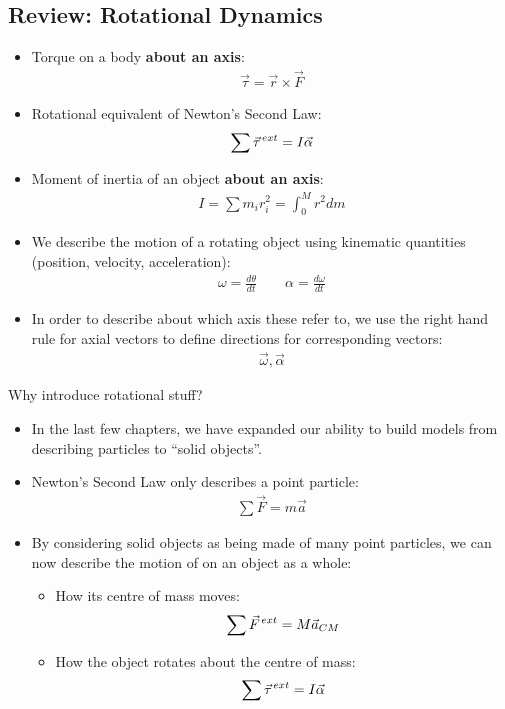 \documentclass[aspectratio=169,
hyperref={colorlinks,urlcolor=blue}
]{beamer}
\begin{document}
\subsection{Review: Rotational Dynamics}
\label{subsec:rotationaldynamicsreview}
{
\begin{itemize}
\item Torque on a body \textbf{about an axis}:
\begin{align*}
\vec \tau = \vec r \times \vec F
\end{align*}
\item Rotational equivalent of Newton's Second Law:
\begin{align*}
\sum \pvec \tau^{ext}=I\vec \alpha
\end{align*}
\item Moment of inertia of an object \textbf{about an axis}:
\begin{align*}
I = \sum m_ir_i^2=\int_0^Mr^2dm
\end{align*}
\end{itemize}
}
{
\begin{itemize}
\item We describe the motion of a rotating object using kinematic quantities (position, velocity, acceleration):
\begin{align*}
\omega=\frac{d\theta}{dt}\quad\quad \alpha=\frac{d\omega}{dt}
\end{align*}
\item In order to describe about which axis these refer to, we use the right hand rule for axial vectors to define directions for corresponding vectors:
\begin{align*}
\vec \omega, \vec \alpha
\end{align*}
\end{itemize}
}


\begin{frame} {Why introduce rotational stuff?}
\begin{itemize}
\item In the last few chapters, we have expanded our ability to build models from describing particles to ``solid objects''.
\item Newton’s Second Law only describes a point particle:
\begin{align*}
\sum \vec F = m\vec a
\end{align*}
\item By considering solid objects as being made of many point particles, we can now describe the motion of on an object as a whole:
\begin{itemize}
\item How its centre of mass moves:
\begin{align*}
\sum \pvec F^{ext} = M\vec a_{CM}
\end{align*}
\item How the object rotates about the centre of mass:
\begin{align*}
\sum \pvec \tau^{ext}=I\vec \alpha
\end{align*}
\end{itemize}
\end{itemize}
\end{frame}
\end{document}
